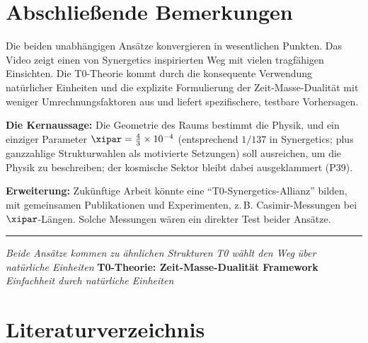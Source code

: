 	\section{Abschließende Bemerkungen}
	
	Die beiden unabhängigen Ansätze konvergieren in wesentlichen Punkten. Das Video zeigt einen von Synergetics inspirierten Weg mit vielen tragfähigen Einsichten. Die T0-Theorie kommt durch die konsequente Verwendung natürlicher Einheiten und die explizite Formulierung der Zeit-Masse-Dualität mit weniger Umrechnungsfaktoren aus und liefert spezifischere, testbare Vorhersagen.
	
	\textbf{Die Kernaussage:} Die Geometrie des Raums bestimmt die Physik, und ein einziger Parameter $\xipar = \frac{4}{3} \times 10^{-4}$ (entsprechend $1/137$ in Synergetics; plus ganzzahlige Strukturwahlen als motivierte Setzungen) soll ausreichen, um die Physik zu beschreiben; der kosmische Sektor bleibt dabei ausgeklammert (P39).
	
	\textbf{Erweiterung:} Zukünftige Arbeit könnte eine ``T0-Synergetics-Allianz'' bilden, mit gemeinsamen Publikationen und Experimenten, z.\,B. Casimir-Messungen bei $\xipar$-Längen. Solche Messungen wären ein direkter Test beider Ansätze.
	
	\vfill
	
	\begin{center}
		\hrule
		\vspace{0.5cm}
		\textit{Beide Ansätze kommen zu ähnlichen Strukturen}
		\textit{T0 wählt den Weg über natürliche Einheiten}
		\vspace{0.3cm}
		\textbf{T0-Theorie: Zeit-Masse-Dualität Framework}
		\textit{Einfachheit durch natürliche Einheiten}
		\vspace{0.3cm}
	\end{center}
	
	\section{Literaturverzeichnis}
	
